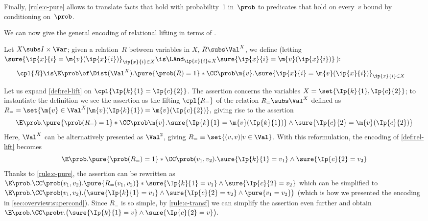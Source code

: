 \documentclass[acmsmall,nonacm,screen,appendix]{acmart}
\begin{document}
Finally, \cref{rule:c-pure} allows to translate facts that hold with probability~1 in~$\prob$ to predicates that hold on every~$v$ bound by conditioning on~$\prob$.



We can now give the general encoding of relational lifting
in terms of \supercond.

\begin{definition}
\label{def:rel-lift}
  Let $X \subs I \times \Var$;
  given a relation~$R$ between variables in $X$,
  \ie $R \subs \Val^{X}$,
  we define
  (letting
  $
    \sure{\ip{x}{i} = \m{v}(\ip{x}{i})}_{\ip{x}{i}\in X} \is
      \LAnd_{\ip{x}{i}\in X}
        \sure{\ip{x}{i} = \m{v}(\ip{x}{i})}
  $):
  \begin{align*}
    \cpl{R} &\is
      \E \prob \of \Dist(\Val^{X}).
        \pure{\prob(R) = 1} *
        \CC\prob \m{v}.
          \sure{\ip{x}{i} = \m{v}(\ip{x}{i})}_{\ip{x}{i}\in X}
  \end{align*}
\end{definition}

\begin{example}
Let us expand \cref{def:rel-lift} on
$\cpl{ \Ip{k}{1} = \Ip{c}{2} }$.
The assertion concerns the variables
$X = \set{\Ip{k}{1}, \Ip{c}{2}}$;
to instantiate the definition we see the assertion as
the lifting $ \cpl{R_{=}} $
of the relation $ R_{=} \subs \Val^X $
defined as
$
  R_{=} =
    \set{ \m{v} \in \Val^{X}
        | \m{v}(\Ip{k}{1}) = \m{v}(\Ip{c}{2}) }
  ,
$
giving rise to the assertion
\[
  \E \prob.
    \pure{\prob(R_{=}) = 1} *
    \CC\prob \m{v}.
      \sure{\Ip{k}{1} = \m{v}(\Ip{k}{1})}
      \land
      \sure{\Ip{c}{2} = \m{v}(\Ip{c}{2})}
\]
Here, $\Val^X$ can be alternatively presented as
$ \Val^2 $, giving
$ R_{=} \equiv \set{(v,v) | v \in \Val} $.
With this reformulation, the encoding of \cref{def:rel-lift} becomes
\[
  \E \prob.
    \pure{\prob(R_{=}) = 1} *
    \CC\prob (v_1,v_2).
      \sure{\Ip{k}{1} = v_1}
      \land
      \sure{\Ip{c}{2} = v_2}
\]
Thanks to \ref{rule:c-pure}, the assertion can be rewritten as
$
  \E \prob.
    \CC\prob (v_1,v_2).
      \pure{R_{=}(v_1,v_2)} *
      \sure{\Ip{k}{1} = v_1}
      \land
      \sure{\Ip{c}{2} = v_2}
$
which can be simplified to
$
  \E \prob.
  \CC\prob (v_1,v_2).\bigl(
    \sure{\Ip{k}{1} = v_1} \land
    \sure{\Ip{c}{2} = v_2} \land
    \pure{v_1=v_2}
  \bigr)
$
(which is how we presented the encoding in \cref{sec:overview:supercond}).
Since $R_{=}$ is so simple,
by \ref{rule:c-transf} we can simplify the assertion even further and obtain
$
  \E \prob.
  \CC\prob v.\bigl(
    \sure{\Ip{k}{1} = v} \land
    \sure{\Ip{c}{2} = v}
  \bigr).
$
\end{example}
\end{document}
